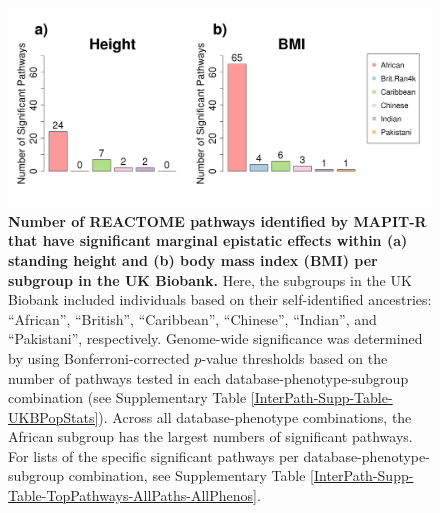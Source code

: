 \documentclass[10pt]{article}
\begin{document}

\begin{figure}[htbp]
\centering
\includegraphics[width = \textwidth]{Images/Supp/InterPath_Supp_Figure_Barplots_REACTOME_vs4.png}
\caption{\textbf{Number of REACTOME pathways identified by MAPIT-R that have significant marginal epistatic effects within (a) standing height and (b) body mass index (BMI) per subgroup in the UK Biobank.} Here, the subgroups in the UK Biobank included individuals based on their self-identified ancestries: ``African'', ``British'', ``Caribbean'', ``Chinese'', ``Indian'', and ``Pakistani'', respectively. Genome-wide significance was determined by using Bonferroni-corrected $p$-value thresholds based on the number of pathways tested in each database-phenotype-subgroup combination (see Supplementary Table \ref{InterPath-Supp-Table-UKBPopStats}). Across all database-phenotype combinations, the African subgroup has the largest numbers of significant pathways. For lists of the specific significant pathways per database-phenotype-subgroup combination, see Supplementary Table \ref{InterPath-Supp-Table-TopPathways-AllPaths-AllPhenos}.}
\label{InterPath-Supp-Figure-Barplots-REACTOME}
\end{figure}
\clearpage

\end{document}
